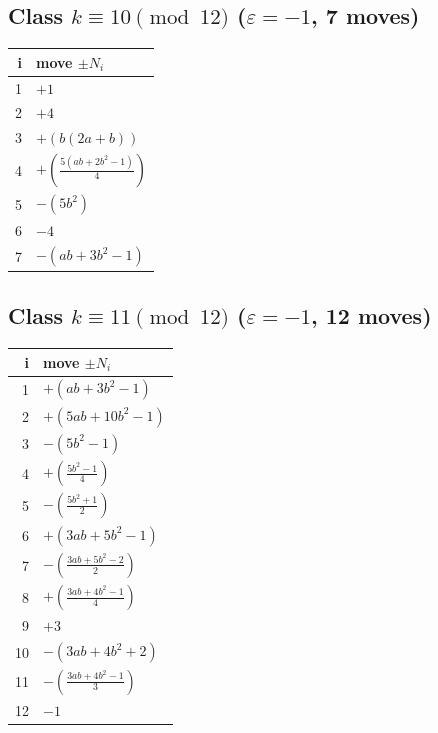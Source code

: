 \subsection*{Class $k\equiv 10\pmod{12}$ \quad ($\varepsilon=-1$, 7 moves)}
\begin{center}\renewcommand{\arraystretch}{1.35}\begin{tabular}{@{}r@{\quad}l@{}}\toprule
i & move $\pm N_i$ \\\midrule
1 & $+1$ \\
2 & $+4$ \\
3 & $+(b \left(2 a + b\right))$ \\
4 & $+(\frac{5 \left(a b + 2 b^{2} - 1\right)}{4})$ \\
5 & $-(5 b^{2})$ \\
6 & $-4$ \\
7 & $-(a b + 3 b^{2} - 1)$ \\
\bottomrule\end{tabular}\end{center}

\subsection*{Class $k\equiv 11\pmod{12}$ \quad ($\varepsilon=-1$, 12 moves)}
\begin{center}\renewcommand{\arraystretch}{1.35}\begin{tabular}{@{}r@{\quad}l@{}}\toprule
i & move $\pm N_i$ \\\midrule
1 & $+(a b + 3 b^{2} - 1)$ \\
2 & $+(5 a b + 10 b^{2} - 1)$ \\
3 & $-(5 b^{2} - 1)$ \\
4 & $+(\frac{5 b^{2} - 1}{4})$ \\
5 & $-(\frac{5 b^{2} + 1}{2})$ \\
6 & $+(3 a b + 5 b^{2} - 1)$ \\
7 & $-(\frac{3 a b + 5 b^{2} - 2}{2})$ \\
8 & $+(\frac{3 a b + 4 b^{2} - 1}{4})$ \\
9 & $+3$ \\
10 & $-(3 a b + 4 b^{2} + 2)$ \\
11 & $-(\frac{3 a b + 4 b^{2} - 1}{3})$ \\
12 & $-1$ \\
\bottomrule\end{tabular}\end{center}
